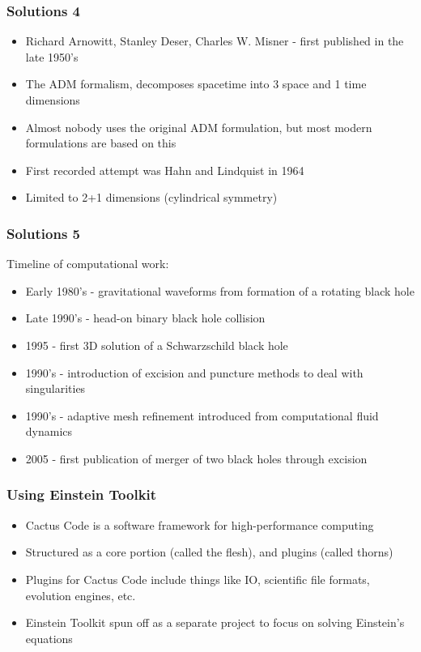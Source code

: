\documentclass{beamer}
\begin{document}
\begin{frame}
  \frametitle{Solutions 4}
  \begin{itemize}
    \item Richard Arnowitt, Stanley Deser, Charles W. Misner - first published in the late 1950's
    \item The ADM formalism, decomposes spacetime into 3 space and 1 time dimensions
    \item Almost nobody uses the original ADM formulation, but most modern formulations are based on this
    \item First recorded attempt was Hahn and Lindquist in 1964
    \item Limited to 2+1 dimensions (cylindrical symmetry)
  \end{itemize} 
\end{frame}

\begin{frame}
  \frametitle{Solutions 5}
  Timeline of computational work:
  \begin{itemize}
    \item Early 1980's - gravitational waveforms from formation of a rotating black hole
    \item Late 1990's - head-on binary black hole collision
    \item 1995 - first 3D solution of a Schwarzschild black hole
    \item 1990's - introduction of excision and puncture methods to deal with singularities
    \item 1990's - adaptive mesh refinement introduced from computational fluid dynamics
    \item 2005 - first publication of merger of two black holes through excision
  \end{itemize}
\end{frame}

\begin{frame}
  \frametitle{Using Einstein Toolkit}
  \begin{itemize}
    \item Cactus Code is a software framework for high-performance computing
    \item Structured as a core portion (called the flesh), and plugins (called thorns)
    \item Plugins for Cactus Code include things like IO, scientific file formats, evolution engines, etc.
    \item Einstein Toolkit spun off as a separate project to focus on solving Einstein's equations 
  \end{itemize}
\end{frame}
\end{document}
